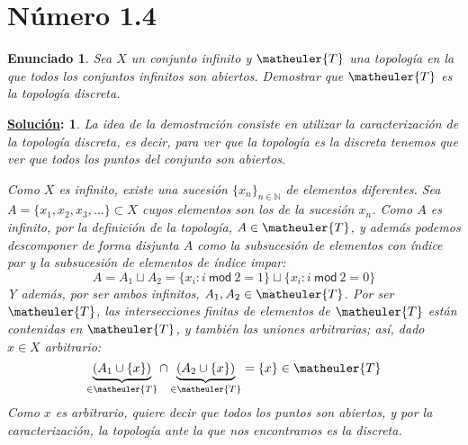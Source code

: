 \documentclass[10pt,a4paper,openright]{book}
\theoremstyle{break}
\newtheorem*{enun}{Enunciado}
\newtheorem*{ej}{\underline{Solución}:}
\begin{document}
\section{Número 1.4}
\begin{enun}
Sea $X$ un conjunto infinito y $\matheuler{T}$ una topología en la que todos los conjuntos infinitos son abiertos. Demostrar que $\matheuler{T}$ es la topología discreta.
\end{enun}
\begin{ej}
La idea de la demostración consiste en utilizar la caracterización de la topología discreta, es decir, para ver que la topología es la discreta tenemos que ver que todos los puntos del conjunto son abiertos.

Como $X$ es infinito, existe una sucesión $\{x_n\}_{n \in \mathbb{N}}$ de elementos diferentes. Sea $A = \{x_1, x_2,x_3,\ldots \} \subset X$ cuyos elementos son los de la sucesión $x_n$. Como $A$ es infinito, por la definición de la topología, $A \in \matheuler{T}$, y además podemos descomponer de forma disjunta $A$ como la subsucesión de elementos con índice par y la subsucesión de elementos de índice impar:
$$A = A_1 \sqcup A_2 = \{x_i : i \ \mathsf{mod} \ 2 = 1\} \sqcup \{x_i : i\  \mathsf{mod} \ 2 = 0\}$$
Y además, por ser ambos infinitos, $A_1, A_2 \in \matheuler{T}$. Por ser $\matheuler{T}$, las intersecciones finitas de elementos de $\matheuler{T}$ están contenidas en $\matheuler{T}$, y también las uniones arbitrarias; así, dado $x \in X$ arbitrario:
$$\underbrace{(A_1 \cup \{x\})}_{\in \matheuler{T}} \cap \underbrace{(A_2 \cup \{x\})}_{\in \matheuler{T}} = \{x\} \in \matheuler{T}$$
Como $x$ es arbitrario, quiere decir que todos los puntos son abiertos, y por la caracterización, la topología ante la que nos encontramos es la discreta.
\end{ej}
\end{document}
